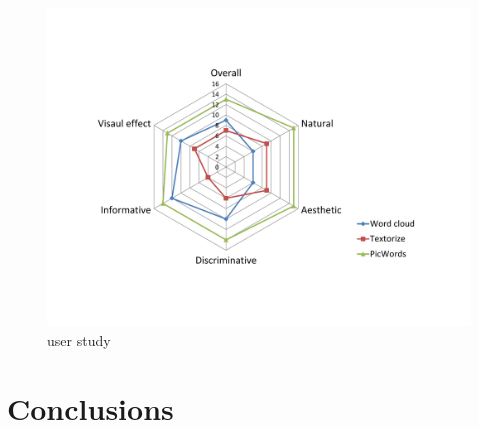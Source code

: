 \documentclass[letter]{sig-alternate}
\begin{document}
\begin{figure}[t]
\begin{center}
\includegraphics[scale=0.35]{figure/baseline2.pdf}
\caption{\small{user study}}
\label{fig:firstfig}
\end{center}
\end{figure}















\section{Conclusions} \label{sec:conclusion}







\scriptsize

\end{document}
